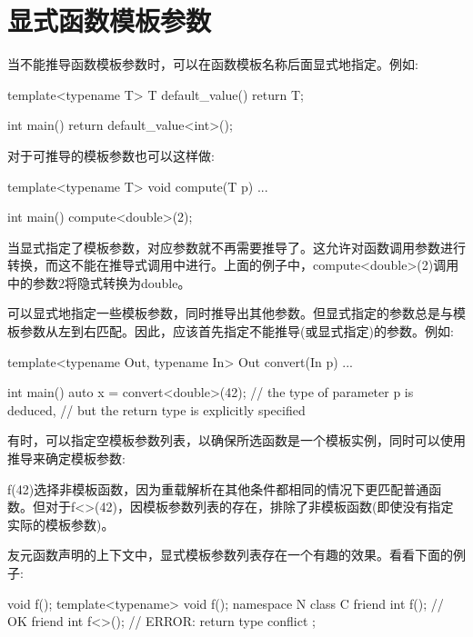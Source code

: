 \section{显式函数模板参数}
当不能推导函数模板参数时，可以在函数模板名称后面显式地指定。例如:

\begin{cpp}
template<typename T> T default_value()
{
	return T{};
}

int main()
{
	return default_value<int>();
}
\end{cpp}

对于可推导的模板参数也可以这样做:

\begin{cpp}
template<typename T> void compute(T p)
{
	...
}

int main()
{
	compute<double>(2);
}
\end{cpp}

当显式指定了模板参数，对应参数就不再需要推导了。这允许对函数调用参数进行转换，而这不能在推导式调用中进行。上面的例子中，compute<double>(2)调用中的参数2将隐式转换为double。

可以显式地指定一些模板参数，同时推导出其他参数。但显式指定的参数总是与模板参数从左到右匹配。因此，应该首先指定不能推导(或显式指定)的参数。例如:

\begin{cpp}
template<typename Out, typename In>
Out convert(In p)
{
	...
}

int main() {
	auto x = convert<double>(42); // the type of parameter p is deduced,
	// but the return type is explicitly specified
}
\end{cpp}

有时，可以指定空模板参数列表，以确保所选函数是一个模板实例，同时可以使用推导来确定模板参数:


f(42)选择非模板函数，因为重载解析在其他条件都相同的情况下更匹配普通函数。但对于f<>(42)，因模板参数列表的存在，排除了非模板函数(即使没有指定实际的模板参数)。

友元函数声明的上下文中，显式模板参数列表存在一个有趣的效果。看看下面的例子:

\begin{cpp}
void f();
template<typename> void f();
namespace N {
	class C {
		friend int f(); // OK
		friend int f<>(); // ERROR: return type conflict
	};
}
\end{cpp}

